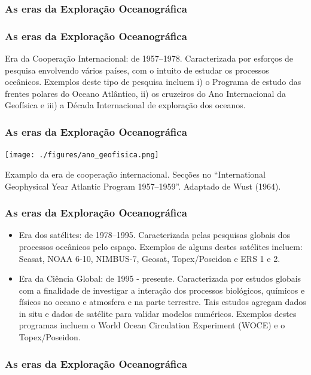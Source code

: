\begin{frame}
    \frametitle{As eras da Exploração Oceanográfica}
    \centerline{}
\end{frame}

\begin{frame}
    \frametitle{As eras da Exploração Oceanográfica}
    Era da Cooperação Internacional: de 1957--1978. Caracterizada por esforços
    de pesquisa envolvendo vários países, com o intuito de estudar os processos
    oceânicos.  Exemplos deste tipo de pesquisa incluem i) o Programa de estudo
    das frentes polares do Oceano Atlântico, ii) os cruzeiros do Ano
    Internacional da Geofísica e iii) a Década Internacional de exploração dos oceanos.
\end{frame}

\begin{frame}
    \frametitle{As eras da Exploração Oceanográfica}
    \centerline{\texttt{[image: ./figures/ano\_geofisica.png]}}
    Examplo da era de cooperação internacional.  Secções no ``International
    Geophysical Year Atlantic Program 1957--1959''.  Adaptado de Wust (1964).
\end{frame}

\begin{frame}
    \frametitle{As eras da Exploração Oceanográfica}
    \begin{itemize}[<+-| alert@+>]
    \item \small{Era dos satélites: de 1978--1995. Caracterizada pelas pesquisas
           globais dos processos oceânicos pelo espaço. Exemplos de alguns
           destes satélites incluem: Seasat, NOAA 6-10, NIMBUS-7, Geosat,
           Topex/Poseidon e ERS 1 e 2.}

    \item \small{Era da Ciência Global: de 1995 - presente. Caracterizada por
           estudos globais com a finalidade de investigar a interação dos
           processos biológicos, químicos e físicos no oceano e atmosfera e na
           parte terrestre. Tais estudos agregam dados in situ e dados de
           satélite para validar modelos numéricos. Exemplos destes programas
           incluem o World Ocean Circulation Experiment (WOCE) e o
           Topex/Poseidon.}
    \end{itemize}
\end{frame}

\begin{frame}
    \frametitle{As eras da Exploração Oceanográfica}
    \centerline{}
\end{frame}

